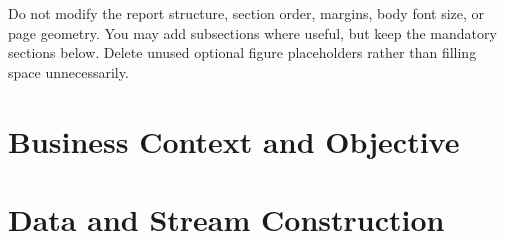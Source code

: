 \documentclass[11pt,a4paper]{article}
\newif\ifdraftinstructions
\newcommand{\instruction}[1]{%
  \ifdraftinstructions
    \begin{instructionbox}[title=What to write here]
      \small\color{SecondaryText}#1
    \end{instructionbox}
  \fi
}
\newcommand{\draftbanner}{%
  \ifdraftinstructions
    \begin{warningbox}[title=Template mode is ON]
      \small This PDF still displays writing guidance. Before final submission, change
      \texttt{\string\draftinstructionstrue} to
      \texttt{\string\draftinstructionsfalse} near the top of \texttt{main.tex} and compile again.
    \end{warningbox}
  \fi
}
\begin{document}
\draftbanner

\begin{keybox}[title=Formatting rule]
Do not modify the report structure, section order, margins, body font size, or page geometry. You may add subsections where useful, but keep the mandatory sections below. Delete unused optional figure placeholders rather than filling space unnecessarily.
\end{keybox}

\section{Business Context and Objective}
\instruction{Briefly describe the assigned business problem and the operational decision to be supported. Identify the two cities and the event target. Explain why this event matters to the business. End the section with one concise objective or guiding question. Do not make the recommendation yet. Suggested length: about half a page.}



\section{Data and Stream Construction}
\instruction{Describe the Open-Meteo data source, historical period, weather variables, sampling frequency, chronological ordering, warm-up, preprocessing, target construction, and any cleaning decisions. Explain how potential outliers were inspected. Remember: valid extreme weather observations are not automatically errors. State explicitly that future information was not used to construct current inputs. Suggested length: half to one page.}
\end{document}
